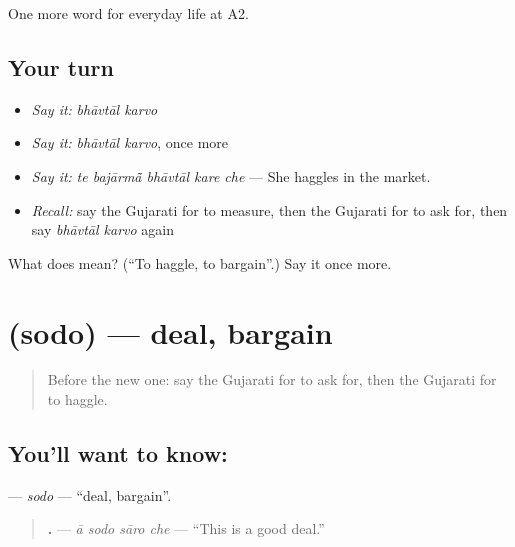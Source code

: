 \begin{grammarlens}[title={What you've built}]
One more word for everyday life at A2.
\end{grammarlens}

\subsection*{Your turn}
\begin{itemize}
\raggedright
  \item \emph{Say it:} \emph{bhāvtāl karvo}
  \item \emph{Say it:} \emph{bhāvtāl karvo}, once more
  \item \emph{Say it:} \emph{te bajārmā̃ bhāvtāl kare che} — She haggles in the market.
  \item \emph{Recall:} say the Gujarati for to measure, then the Gujarati for to ask for, then say \emph{bhāvtāl karvo} again
\end{itemize}

\begin{tcolorbox}[breakable,colback=teal!4,colframe=teal!35!black,title={Before you move on}]
What does   mean? (\textquotedblleft{}To haggle, to bargain\textquotedblright{}.) Say it once more.
\end{tcolorbox}
\section[\texorpdfstring{\gu{સોદો} (sodo)}{સોદો (sodo)}]{ (sodo) — deal, bargain}

\label{lesson:GU-C185-sodo}



\begin{quote}
Before the new one: say the Gujarati for to ask for, then the Gujarati for to haggle.
\end{quote}

\subsection*{You'll want to know: }
\textbf{} — \emph{sodo} — \textquotedblleft{}deal, bargain\textquotedblright{}.

\begin{quote}
\textbf{   .} — \emph{ā sodo sāro che} — \textquotedblleft{}This is a good deal.\textquotedblright{}
\end{quote}


